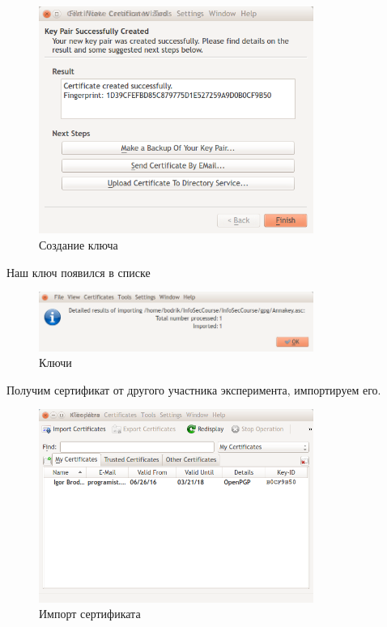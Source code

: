 \begin{figure}[H]
	\centering
	\includegraphics[width=0.8\textwidth]{images/7.png}
	\caption{Создание ключа}
\end{figure}

Наш ключ появился в списке

\begin{figure}[H]
	\centering
	\includegraphics[width=0.8\textwidth]{images/8.png}
	\caption{Ключи}
\end{figure}

Получим сертификат от другого участника эксперимента, импортируем его.

\begin{figure}[H]
	\centering
	\includegraphics[width=0.8\textwidth]{images/9.png}
	\caption{Импорт сертификата}
\end{figure}

